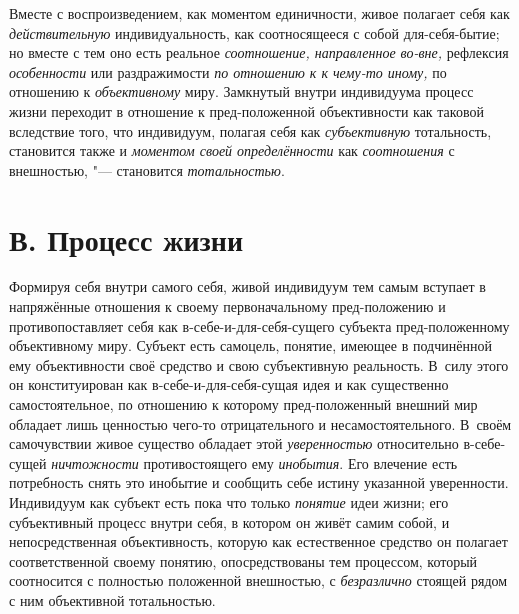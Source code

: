 Вместе с воспроизведением, как моментом единичности, живое
полагает себя как {\em действительную}
индивидуальность, как соотносящееся с собой для-себя-бытие;
но вместе с тем оно есть реальное
{\em соотношение, направленное во-вне,}
рефлексия
{\em особенности} или
раздражимости {\em по отношению к
к чему-то иному,} по отношению к
{\em объективному} миру.
Замкнутый внутри индивидуума процесс жизни переходит в отношение к
пред-положенной объективности как таковой вследствие того, что
индивидуум, полагая себя как
{\em субъективную}
тотальность, становится также и
{\em моментом своей определённости}
как {\em соотношения}
с внешностью, "--- становится
{\em тотальностью}.

\section[В. Процесс жизни]{В. Процесс жизни}

Формируя себя внутри самого себя, живой индивидуум тем самым
вступает в напряжённые отношения к своему первоначальному пред-положению и
противопоставляет себя как в-себе-и-для-себя-сущего субъекта
пред-положенному объективному миру. Субъект есть самоцель, понятие, имеющее
в подчинённой ему объективности своё средство и свою субъективную
реальность. В~силу этого он конституирован как в-себе-и-для-себя-сущая идея
и как существенно самостоятельное, по отношению к которому пред-положенный
внешний мир обладает лишь ценностью чего-то отрицательного и
несамостоятельного. В~своём самочувствии живое существо обладает этой
{\em уверенностью}
относительно в-себе-сущей
{\em ничтожности}
противостоящего ему
{\em инобытия}. Его
влечение есть потребность снять это инобытие и сообщить себе истину
указанной уверенности. Индивидуум как субъект есть пока что только
{\em понятие} идеи жизни;
его субъективный процесс внутри себя, в котором он живёт самим собой, и
непосредственная объективность, которую как естественное средство он
полагает соответственной своему понятию, опосредствованы тем процессом,
который соотносится с полностью положенной внешностью, с
{\em безразлично} стоящей
рядом с ним объективной тотальностью.

